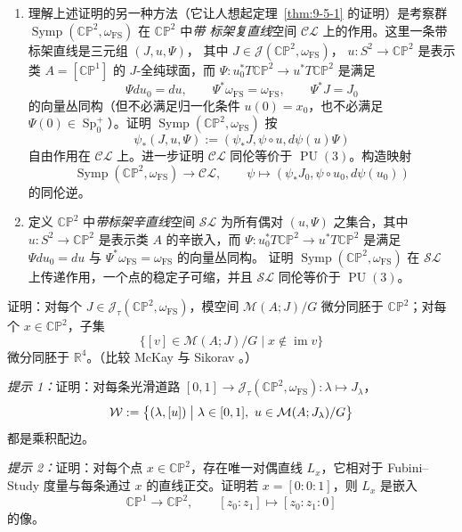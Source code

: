 \begin{exercise}\label{ex:9-5-9}
\begin{enumerate}[label=\textup{(\roman*)}]
\item 理解上述证明的另一种方法（它让人想起定理~\ref{thm:9-5-1} 的证明）是考察群
$\operatorname{Symp}(\mathbb{CP}^2,\omega_{\mathrm{FS}})$ 在 $\mathbb{CP}^2$ 中\emph{带
标架复直线}空间 $\mathcal{CL}$ 上的作用。这里一条带标架直线是三元组 $(J,u,\Psi)$，
其中 $J\in\mathcal J(\mathbb{CP}^2,\omega_{\mathrm{FS}})$，
$u:S^2\to\mathbb{CP}^2$ 是表示类 $A=[\mathbb{CP}^1]$ 的 $J$-全纯球面，而
$\Psi:u_0^*T\mathbb{CP}^2\to u^*T\mathbb{CP}^2$ 是满足
\[
  \Psi du_0=du,
  \qquad \Psi^*\omega_{\mathrm{FS}}=\omega_{\mathrm{FS}},
  \qquad \Psi^*J=J_0
\]
的向量丛同构（但不必满足归一化条件 $u(0)=x_0$，也不必满足
$\Psi(0)\in\operatorname{Sp}_0^+$）。证明
$\operatorname{Symp}(\mathbb{CP}^2,\omega_{\mathrm{FS}})$ 按
\[
  \psi_*(J,u,\Psi):=(\psi_*J,\psi\circ u,d\psi(u)\Psi)
\]
自由作用在 $\mathcal{CL}$ 上。进一步证明 $\mathcal{CL}$ 同伦等价于
$\operatorname{PU}(3)$。构造映射
\[
  \operatorname{Symp}(\mathbb{CP}^2,\omega_{\mathrm{FS}})
  \longrightarrow\mathcal{CL},
  \qquad
  \psi\longmapsto(\psi_*J_0,\psi\circ u_0,d\psi(u_0))
\]
的同伦逆。

\item 定义 $\mathbb{CP}^2$ 中\emph{带标架辛直线}空间 $\mathcal{SL}$ 为所有偶对
$(u,\Psi)$ 之集合，其中 $u:S^2\to\mathbb{CP}^2$ 是表示类 $A$ 的辛嵌入，而
$\Psi:u_0^*T\mathbb{CP}^2\to u^*T\mathbb{CP}^2$ 是满足
$\Psi du_0=du$ 与 $\Psi^*\omega_{\mathrm{FS}}=\omega_{\mathrm{FS}}$ 的向量丛同构。
证明 $\operatorname{Symp}(\mathbb{CP}^2,\omega_{\mathrm{FS}})$ 在
$\mathcal{SL}$ 上传递作用，一个点的稳定子可缩，并且 $\mathcal{SL}$ 同伦等价于
$\operatorname{PU}(3)$。
\end{enumerate}
\end{exercise}

\begin{exercise}\label{ex:9-5-10}
证明：对每个 $J\in\mathcal J_\tau(\mathbb{CP}^2,\omega_{\mathrm{FS}})$，模空间
$\mathcal M(A;J)/G$ 微分同胚于 $\mathbb{CP}^2$；对每个
$x\in\mathbb{CP}^2$，子集
\[
  \{[v]\in\mathcal M(A;J)/G\mid x\notin\operatorname{im}v\}
\]
微分同胚于 $\mathbb R^4$。（比较 McKay  与 Sikorav 。）

\emph{提示 1：}证明：对每条光滑道路
$[0,1]\to\mathcal J_\tau(\mathbb{CP}^2,\omega_{\mathrm{FS}}):
\lambda\mapsto J_\lambda$，
\[
  \mathcal W:=\bigl\{(\lambda,[u])\bigm|
  \lambda\in[0,1],\ u\in\mathcal M(A;J_\lambda)/G\bigr\}
\]
都是乘积配边。

\emph{提示 2：}证明：对每个点 $x\in\mathbb{CP}^2$，存在唯一对偶直线 $L_x$，它相对于
Fubini--Study 度量与每条通过 $x$ 的直线正交。证明若 $x=[0:0:1]$，则 $L_x$ 是嵌入
\[
  \mathbb{CP}^1\longrightarrow\mathbb{CP}^2,
  \qquad[z_0:z_1]\longmapsto[z_0:z_1:0]
\]
的像。
\end{exercise}
